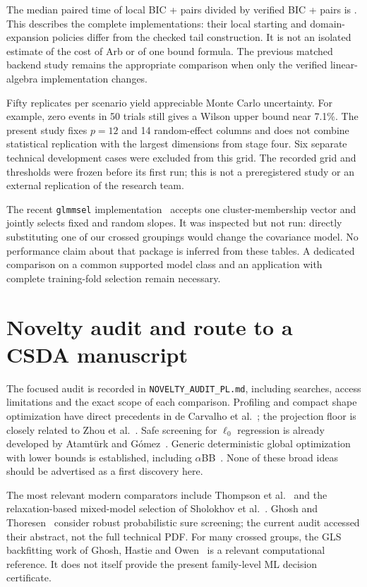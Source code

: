\documentclass[11pt,a4paper]{article}
\theoremstyle{remark}\newtheorem{remark}[theorem]{Remark}
\begin{document}
The median paired time of local BIC + pairs divided by verified BIC + pairs
is \ComparisonLocalRatio{}. This describes the complete implementations:
their local starting and domain-expansion policies differ from the checked
tail construction. It is not an isolated estimate of the cost of Arb or of
one bound formula. The previous matched backend study remains the appropriate
comparison when only the verified linear-algebra implementation changes.

Fifty replicates per scenario yield appreciable Monte Carlo uncertainty. For
example, zero events in 50 trials still gives a Wilson upper bound near 7.1\%.
The present study fixes $p=12$ and 14 random-effect columns and does not combine
statistical replication with the largest dimensions from stage four.
Six separate technical development cases were excluded from this grid.
The recorded grid and thresholds were frozen before its first run; this is
not a preregistered study or an external replication of the research team.

The recent \texttt{glmmsel} implementation~\cite{glmmselmanual} accepts one
cluster-membership vector and jointly selects fixed and random slopes.
It was inspected but not run: directly substituting one of our crossed
groupings would change the covariance model. No performance claim about that
package is inferred from these tables. A dedicated comparison on a common
supported model class and an application with complete training-fold selection
remain necessary.

\section{Novelty audit and route to a CSDA manuscript}
The focused audit is recorded in \texttt{NOVELTY\_AUDIT\_PL.md}, including searches,
access limitations and the exact scope of each comparison. Profiling and compact
shape optimization have direct precedents in de Carvalho et al.~\cite{carvalho};
the projection floor is closely related to Zhou et al.~\cite{zhou}. Safe
screening for $\ell_0$ regression is already developed by Atamt\"urk and
G\'omez~\cite{atamturk}. Generic deterministic global optimization with lower
bounds is established, including $\alpha$BB~\cite{alphabb}. None of these broad
ideas should be advertised as a first discovery here.

The most relevant modern comparators include Thompson et al.~\cite{thompson}
and the relaxation-based mixed-model selection of Sholokhov et al.~\cite{sholokhov}.
Ghosh and Thoresen~\cite{ghosh} consider robust probabilistic sure screening;
the current audit accessed their abstract, not the full technical PDF. For many
crossed groups, the GLS backfitting work of Ghosh, Hastie and Owen~\cite{backfit}
is a relevant computational reference. It does not itself provide the present
family-level ML decision certificate.
\end{document}
